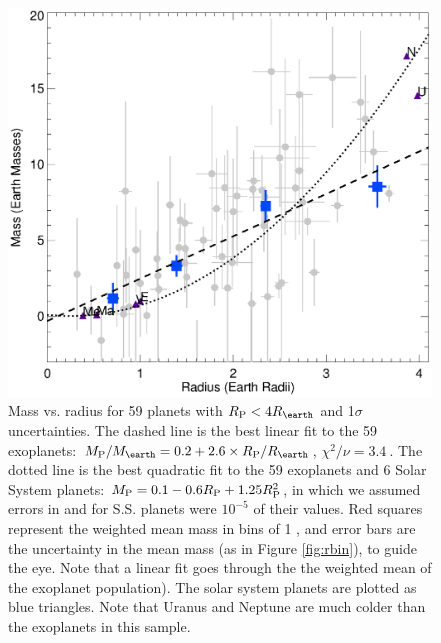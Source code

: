 \documentclass[11pt]{aastex}
\newcommand{\chisquared}{3.4~}
\begin{document}
\begin{figure}[htbp] %
   \centering
    \includegraphics[width=6in]{rm_small4.eps} 
   \caption{Mass vs. radius for 59 planets with $\rpl < 4 \rearth$ and 1$\sigma$ uncertainties.  The dashed line is the best linear fit to the 59 exoplanets: $\mpl/\mearth = 0.2 + 2.6 \times \rpl/\rearth$, $\chi^2/\nu = \chisquared$.  The dotted line is the best quadratic fit to the 59 exoplanets and 6 Solar System planets: $M_{\rm P} = 0.1 - 0.6 R_{\rm P} + 1.25 R_{\rm P}^2$, in which we assumed errors in \mpl and \rpl for S.S. planets were $10^{-5}$ of their values.  Red squares represent the weighted mean mass in bins of 1 \rearth, and error bars are the uncertainty in the mean mass (as in Figure \ref{fig:rbin}), to guide the eye.  Note that a linear fit goes through the the weighted mean of the exoplanet population).  The solar system planets are plotted as blue triangles.  Note that Uranus and Neptune are much colder than the exoplanets in this sample.}
   \label{fig:rm_4}
\end{figure}
\end{document}

